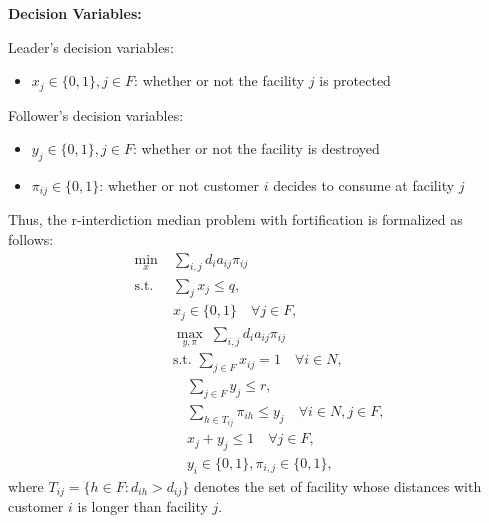 \documentclass[11pt]{article}
\begin{document}
\noindent \textbf{Decision Variables: }

Leader's decision variables:
\begin{itemize}
	\item $x_j \in \{0, 1\}, j\in F$:  whether or not the facility $j$ is protected
\end{itemize}

Follower's decision variables:
\begin{itemize}
	\item $y_j \in \{0, 1\}, j\in F$: whether or not the facility is destroyed
	\item $\pi_{ij} \in \{0, 1\}$: whether or not customer $i$ decides to consume at facility $j$
\end{itemize}

Thus, the r-interdiction median problem with fortification \cite{scaparra2008bilevel,aksen2012bilevel,zhang2016competitive} is formalized as follows:
\begin{align*}
\min_x\; & \sum_{i, j} d_ia_{ij}\pi_{ij}\\
\text{s.t.~} & \sum_j x_j \leq q, \\
& x_j \in \{0,1\} \quad \forall j\in F, \\
& \max_{y, \pi}\;  \sum_{i, j} d_ia_{ij}\pi_{ij} \\
& \text{s.t.~} \sum_{j\in F} x_{ij} = 1\quad \forall i\in N, \\
& \quad \sum_{j\in F} y_j \leq r, \\
& \quad \sum_{h \in T_{ij}} \pi_{ih} \leq y_j \quad \forall i\in N, j\in F,\\
& \quad x_j + y_j \leq 1 \quad \forall j\in F,\\
& \quad y_i \in \{0, 1\}, \pi_{i,j} \in \{0, 1\},
\end{align*}
where $T_{ij} = \{h\in F: d_{ih} > d_{ij}\}$ denotes the set of facility whose distances with customer $i$ is longer than facility $j$.



\newpage
\end{document}
